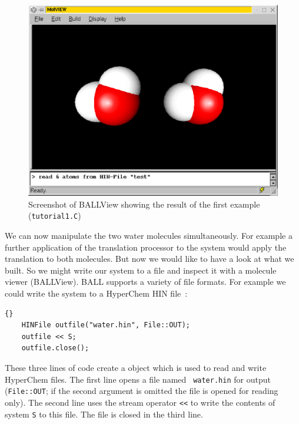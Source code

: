 \begin{figure}[t]
	\centering
	\includegraphics[width=\textwidth]{tut1_screenshot}
	\caption{Screenshot of BALLView showing the result of the first example
					 ({\tt tutorial1.C})}
	\label{fig:tut1-screenshot}
\end{figure}
\noindent
We can now manipulate the two water molecules simultaneously. For example a
further application of the translation processor to the system would apply
the translation to both molecules.
But now we would like to have a look at what we built. So we might write our
system to a file and inspect it with a molecule viewer (\eg BALLView).
BALL supports a variety of file formats. For example we could write the system
to a HyperChem HIN file~\cite{HyperChem}:
\begin{lstlisting}{}
	HINFile outfile("water.hin", File::OUT);
	outfile << S;
	outfile.close();
\end{lstlisting}
\noindent
These three lines of code create a  object which is used to
read and write HyperChem files. The first line opens a file named {\tt
water.hin} for output ({\tt File::OUT}; if the second argument is omitted the
file is opened for reading only).
The second line uses the stream operator {\tt <<} to write the contents
of system {\tt S} to this file. The file is closed in the third line.


% 

